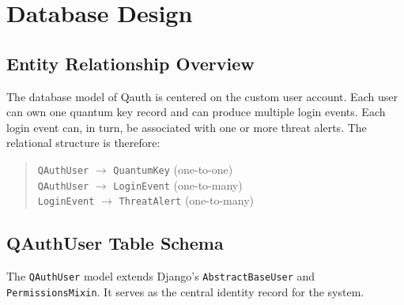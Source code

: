 \section{Database Design}

\subsection{Entity Relationship Overview}
The database model of Qauth is centered on the custom user account. Each user can own one quantum key record and can produce multiple login events. Each login event can, in turn, be associated with one or more threat alerts. The relational structure is therefore:

\begin{quote}
\texttt{QAuthUser} $\rightarrow$ \texttt{QuantumKey} (one-to-one) \\
\texttt{QAuthUser} $\rightarrow$ \texttt{LoginEvent} (one-to-many) \\
\texttt{LoginEvent} $\rightarrow$ \texttt{ThreatAlert} (one-to-many)
\end{quote}

\subsection{QAuthUser Table Schema}
The \texttt{QAuthUser} model extends Django's \texttt{AbstractBaseUser} and \texttt{PermissionsMixin}. It serves as the central identity record for the system.

